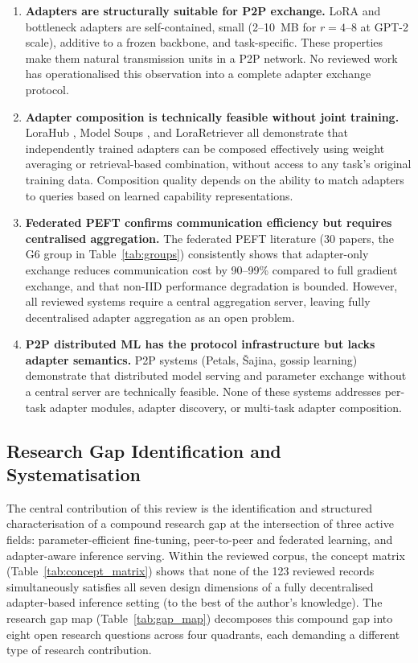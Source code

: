 \begin{enumerate}
  \item \textbf{Adapters are structurally suitable for P2P exchange.} LoRA and
    bottleneck adapters are self-contained, small (2--10~MB for $r = 4$--$8$ at
    GPT-2 scale), additive to a frozen backbone, and task-specific. These properties
    make them natural transmission units in a P2P network. No reviewed work has operationalised this observation into a complete adapter exchange protocol.

  \item \textbf{Adapter composition is technically feasible without joint training.}
    LoraHub \cite{Huang2023}, Model Soups \cite{Wortsman2022}, and
    LoraRetriever \cite{ZhaoLoraRetriever2024} all demonstrate that independently
    trained adapters can be composed effectively using weight averaging or retrieval-based
    combination, without access to any task's original training data. Composition quality
    depends on the ability to match adapters to queries based on learned capability
    representations.

  \item \textbf{Federated PEFT confirms communication efficiency but requires
    centralised aggregation.} The federated PEFT literature (30 papers, the
    G6 group in Table~\ref{tab:groups}) consistently
    shows that adapter-only exchange reduces communication cost by 90--99\% compared
    to full gradient exchange, and that non-IID performance degradation is bounded.
    However, all reviewed systems require a central aggregation server, leaving fully
    decentralised adapter aggregation as an open problem.

  \item \textbf{P2P distributed ML has the protocol infrastructure but lacks adapter
    semantics.} P2P systems (Petals, Šajina, gossip learning) demonstrate that
    distributed model serving and parameter exchange without a central server are
    technically feasible. None of these systems addresses per-task adapter modules,
    adapter discovery, or multi-task adapter composition.
\end{enumerate}

\subsection{Research Gap Identification and Systematisation}
\label{sec:conclusion:contributions}

The central contribution of this review is the identification and structured
characterisation of a compound research gap at the intersection of three active
fields: parameter-efficient fine-tuning, peer-to-peer and federated learning,
and adapter-aware inference serving. Within the reviewed corpus, the concept
matrix (Table~\ref{tab:concept_matrix}) shows that none of the 123 reviewed
records simultaneously satisfies all seven design dimensions of a fully
decentralised adapter-based inference setting (to the best of the author's
knowledge). The research gap map (Table~\ref{tab:gap_map})
decomposes this compound gap into eight open research questions across four
quadrants, each demanding a different type of research contribution.

